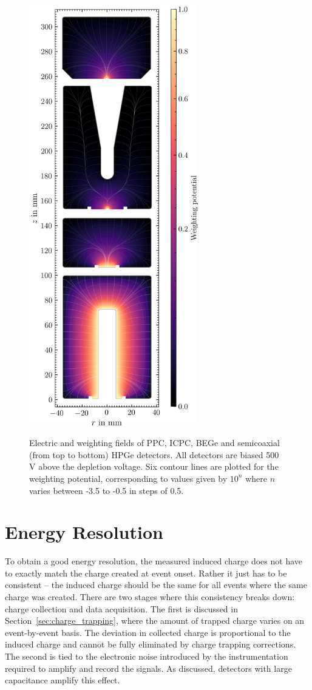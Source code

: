 \begin{figure}[H]
{		\includegraphics[width = 2.9in]{figs/ge/w_field.png}
		\label{fig:dets_weighting}
	}
	\caption{Electric and weighting fields of PPC, ICPC, BEGe and semicoaxial (from top to bottom) HPGe detectors. All detectors are biased 500\,V above the depletion voltage. Six contour lines are plotted for the weighting potential, corresponding to values given by $10^n$ where $n$ varies between -3.5 to -0.5 in steps of 0.5.} 
	\label{fig:dets_fields}
\end{figure}

\section{Energy Resolution}

To obtain a good energy resolution, the measured induced charge does not have to exactly match the charge created at event onset. Rather it just has to be consistent -- the induced charge should be the same for all events where the same charge was created. There are two stages where this consistency breaks down: charge collection and data acquisition. The first is discussed in Section~\ref{sec:charge_trapping}, where the amount of trapped charge varies on an event-by-event basis. The deviation in collected charge is proportional to the induced charge and cannot be fully eliminated by charge trapping corrections. The second is tied to the electronic noise introduced by the instrumentation required to amplify and record the signals. As discussed, detectors with large capacitance amplify this effect.

